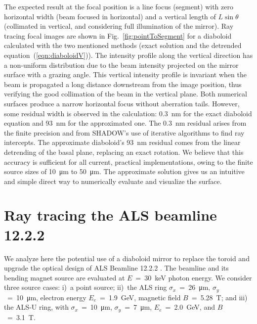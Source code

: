 \documentclass[preprint]{iucr}       %
\newcommand{\inred}[1]{{\color{red}#1}}
\begin{document}
The expected result at the focal position is a line focus (segment) with zero horizontal width \inred{(beam focused in horizontal)} and a vertical length of $L\sin\theta$ \inred{(collimated in vertical, and considering full illumination of the mirror)}. Ray tracing focal images are shown in Fig.~\ref{fig:pointToSegment} for a diaboloid calculated with the two mentioned methods (exact solution and the detrended equation~(\ref{eqn:diaboloidV})). The intensity profile along the vertical direction has a non-uniform distribution due to the beam intensity projected on the mirror surface with a grazing angle.
\inred{This vertical intensity profile is invariant when the beam is propagated a long distance downstream from the image position, thus verifying the good collimation of the beam in the vertical plane.} Both numerical surfaces produce a narrow horizontal focus without aberration tails. However, some residual width is observed in the calculation: \SI{0.3}{\nano\meter} for the exact diaboloid equation and \SI{93}{\nano\meter} for the approximated one. The \SI{0.3}{\nano\meter} residual arises from the finite precision and from SHADOW's use of iterative algorithms to find ray intercepts.
The approximate diaboloid's \SI{93}{\nano\meter} residual comes from the linear detrending of the basal plane, replacing an exact rotation. We believe that this accuracy is sufficient for all current, practical implementations, owing to the finite source sizes of \SI{10}{\micro\meter} to \SI{50}{\micro\meter}. The approximate solution gives us an intuitive and simple direct way to numerically evaluate and visualize the surface.

\section{Ray tracing the ALS beamline 12.2.2}
\label{sec:beamline}

We analyze here the potential use of a diaboloid mirror to replace the toroid and upgrade the optical design of ALS Beamline 12.2.2 \cite{bl1222,MacDowell2004}. The beamline and its bending magnet source are evaluated at $E$~=~\SI{30}{\kilo\electronvolt} photon energy. We consider three source cases: i)~a point source; ii)~the ALS ring
$\sigma_x$~=~\SI{26}{\micro\meter}, $\sigma_y$~=~\SI{10}{\micro\meter}, 
electron energy $E_e$~=~\SI{1.9}{\giga\electronvolt}, magnetic field $B$~=~\SI{5.28}{\tesla}; and iii) the ALS-U ring, with $\sigma_x$~=~\SI{10}{\micro\meter}, $\sigma_y$~=~\SI{7}{\micro\meter}, $E_e$~=~\SI{2.0}{\giga\electronvolt}, and $B$~=~\SI{3.1}{\tesla}. 
\end{document}

